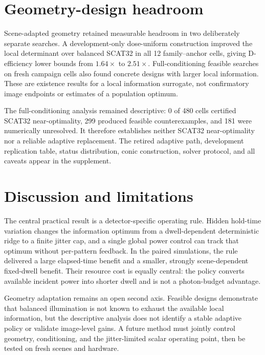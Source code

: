 \documentclass[10pt,twocolumn]{article}
\begin{document}
\FloatBarrier
\section{Geometry-design headroom}
\label{sec:geometry-headroom}
Scene-adapted geometry retained measurable headroom in two deliberately
separate searches. A development-only dose-uniform construction improved the
local determinant over balanced SCAT32 in all 12 family--anchor cells, giving
D-efficiency lower bounds from $1.64\times$ to $2.51\times$. Full-conditioning
feasible searches on fresh campaign cells also found concrete designs with
larger local information. These are existence results for a local information
surrogate, not confirmatory image endpoints or estimates of a population
optimum.

The full-conditioning analysis remained descriptive: 0 of 480 cells certified
SCAT32 near-optimality, 299 produced feasible counterexamples, and 181 were
numerically unresolved. It therefore establishes neither SCAT32
near-optimality nor a reliable adaptive replacement. The retired adaptive path,
development replication table, status distribution, conic construction,
solver protocol, and all caveats appear in the supplement.

\section{Discussion and limitations}
\label{sec:discussion}
The central practical result is a detector-specific operating rule. Hidden
hold-time variation changes the information optimum from a dwell-dependent
deterministic ridge to a finite jitter cap, and a single global power control
can track that optimum without per-pattern feedback. In the paired simulations,
the rule delivered a large elapsed-time benefit and a smaller, strongly
scene-dependent fixed-dwell benefit. Their resource cost is equally central:
the policy converts available incident power into shorter dwell and is not a
photon-budget advantage.

Geometry adaptation remains an open second axis. Feasible designs demonstrate
that balanced illumination is not known to exhaust the available local
information, but the descriptive analysis does not identify a stable adaptive
policy or validate image-level gains. A future method must jointly control
geometry, conditioning, and the jitter-limited scalar operating point, then be
tested on fresh scenes and hardware.
\end{document}
